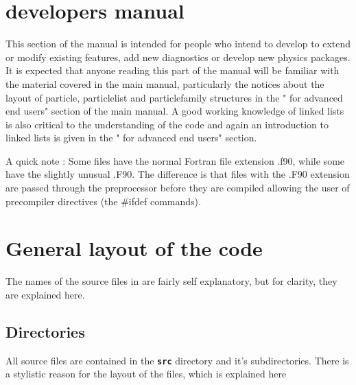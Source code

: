 \documentclass[12pt,a4paper]{article}
\newcommand{\inlinecode}[1]{{\color{warwickred} \bf\texttt{#1}}}
\newcommand{\EPOCH}{{\color{warwickdark}\fontfamily{phv}\selectfont{EPOCH}}}
\begin{document}


\section{{\EPOCH} developers manual}
This section of the manual is intended for people who intend to develop {\EPOCH}
to extend or modify existing features, add new diagnostics or develop new
physics packages. It is expected that anyone reading this part of the manual
will be familiar with the material covered in the main manual, particularly
the notices about the layout of particle, particlelist and particlefamily
structures in the "{\EPOCH} for advanced end users" section of the main
manual. A good working knowledge of linked lists is also critical to the
understanding of the code and again an introduction to linked lists is given
in the "{\EPOCH} for advanced end users" section.

A quick note : Some files have the normal Fortran file extension .f90, while
some have the slightly unusual .F90. The difference is that files with the
.F90 extension are passed through the preprocessor before they are compiled
allowing the user of precompiler directives (the \#ifdef commands).

\section{General layout of the {\EPOCH} code}

The names of the source files in {\EPOCH} are fairly self explanatory, but for
clarity, they are explained here.

\subsection{Directories}
All source files are contained in the \inlinecode{src} directory and it's
subdirectories. There is a stylistic reason for the layout of the files, which
is explained here
\end{document}
